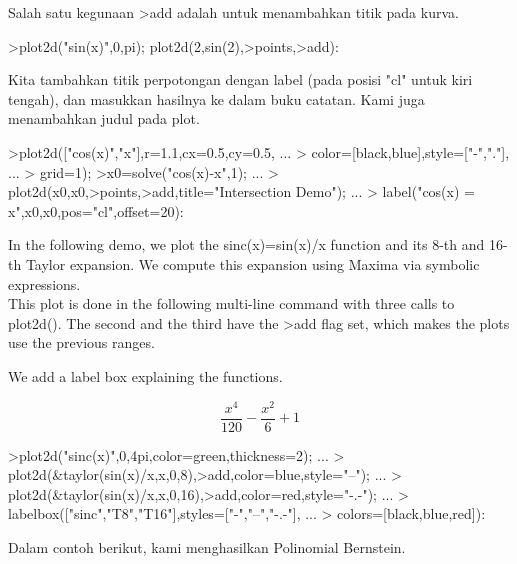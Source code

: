 \documentclass[a4paper,10pt]{article}
\begin{document}
\begin{eulernotebook}
\begin{eulercomment}
\begin{eulercomment}
\begin{eulercomment}
\begin{eulercomment}
\begin{eulercomment}
Salah satu kegunaan \textgreater{}add adalah untuk menambahkan titik pada kurva.
\end{eulercomment}
\begin{eulerprompt}
>plot2d("sin(x)",0,pi); plot2d(2,sin(2),>points,>add):
\end{eulerprompt}
\begin{eulercomment}
Kita tambahkan titik perpotongan dengan label (pada posisi "cl" untuk
kiri tengah), dan masukkan hasilnya ke dalam buku catatan. Kami juga
menambahkan judul pada plot.
\end{eulercomment}
\begin{eulerprompt}
>plot2d(["cos(x)","x"],r=1.1,cx=0.5,cy=0.5, ...
>  color=[black,blue],style=["-","."], ...
>  grid=1);
>x0=solve("cos(x)-x",1);  ...
>  plot2d(x0,x0,>points,>add,title="Intersection Demo");  ...
>  label("cos(x) = x",x0,x0,pos="cl",offset=20):
\end{eulerprompt}
\begin{eulercomment}
In the following demo, we plot the sinc(x)=sin(x)/x function and its 8-th and 16-th
Taylor expansion. We compute this expansion using Maxima via symbolic expressions.\\
This plot is done in the following multi-line command with three calls to plot2d().
The second and the third have the \textgreater{}add flag set, which makes the plots use the
previous ranges.

We add a label box explaining the functions.
\end{eulercomment}
\begin{eulerformula}
\[
\frac{x^4}{120}-\frac{x^2}{6}+1
\]
\end{eulerformula}
\begin{eulerprompt}
>plot2d("sinc(x)",0,4pi,color=green,thickness=2); ...
>  plot2d(&taylor(sin(x)/x,x,0,8),>add,color=blue,style="--"); ...
>  plot2d(&taylor(sin(x)/x,x,0,16),>add,color=red,style="-.-"); ...
>  labelbox(["sinc","T8","T16"],styles=["-","--","-.-"], ...
>    colors=[black,blue,red]):
\end{eulerprompt}
\begin{eulercomment}
Dalam contoh berikut, kami menghasilkan Polinomial Bernstein.


\end{eulercomment}
\end{eulercomment}
\end{eulercomment}
\end{eulercomment}
\end{eulercomment}
\end{eulernotebook}
\end{document}
